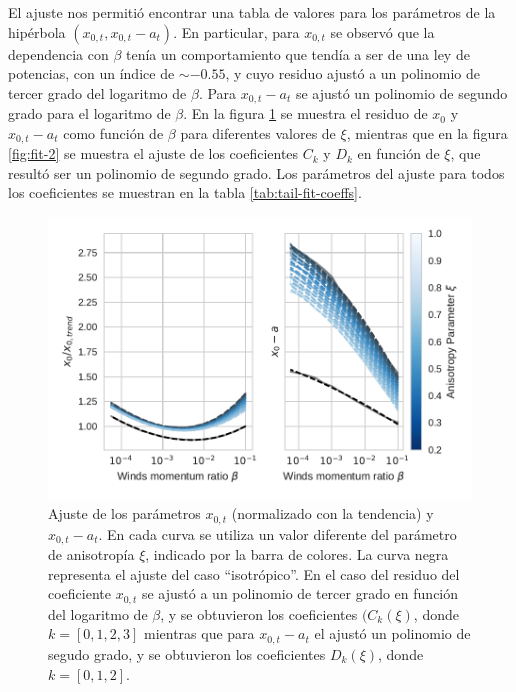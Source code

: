 El ajuste nos permitió encontrar una tabla de valores para los parámetros de la hipérbola $(x_{0,t}, x_{0,t} - a_t)$. En particular, para $x_{0,t}$ se observó que la dependencia con $\beta$ tenía un comportamiento que tendía a ser de una ley de potencias, con un índice de $\sim -0.55$, y cuyo residuo ajustó a un polinomio de tercer grado del logaritmo de $\beta$. Para $x_{0,t} - a_t$ se ajustó un polinomio de segundo grado para el logaritmo de $\beta$. En la figura \ref{fig:fit-1} se muestra el residuo de $x_0$ y $x_{0,t} - a_t$ como función de $\beta$ para diferentes valores de $\xi$, mientras que en la figura \ref{fig:fit-2} se muestra el ajuste de los coeficientes $C_k$ y $D_k$ en función de $\xi$, que resultó ser un polinomio de segundo grado. Los parámetros del ajuste para todos los coeficientes se muestran en la tabla \ref{tab:tail-fit-coeffs}.

\begin{figure}
  \centering
  \includegraphics[width=0.8\linewidth]{./Figures/fit-tail-params-1}
  \caption{Ajuste de los parámetros $x_{0,t}$ (normalizado con la tendencia) y $x_{0,t} -a_t$. En cada curva se utiliza un valor diferente del parámetro de anisotropía $\xi$, indicado por la barra de colores. La curva negra representa el ajuste del caso ``isotrópico''. En el caso del residuo del coeficiente $x_{0,t}$ se ajustó a un polinomio de tercer grado en función del logaritmo de $\beta$, y se obtuvieron los coeficientes $(C_k(\xi)$, donde $k=[0, 1, 2, 3]$ mientras que para $x_{0,t} - a_t$ el ajustó un polinomio de segudo grado, y se obtuvieron los coeficientes $D_k(\xi)$, donde $k=[0, 1, 2]$.}
  \label{fig:fit-1}
\end{figure}

